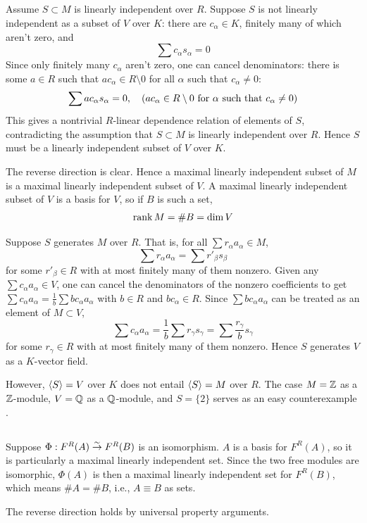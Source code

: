 \documentclass[12pt]{article}
\begin{document}
\setcounter{subsection}{6}
\subsection{} 
Assume $S \subset M$ is linearly independent over $R$.
Suppose $S$ is not linearly independent as a subset of $V$ over $K$: 
there are $c_\alpha \in K$, finitely many of which aren't zero, and 
$$\sum c_\alpha s_\alpha = 0$$
Since only finitely many $c_\alpha$ aren't zero, one can cancel denominators: 
there is some $a \in R$ such that $a c_\alpha \in R \setminus 0$ for all $\alpha$ such that $c_\alpha \neq 0$: 
$$\sum ac_\alpha s_\alpha = 0, \quad (ac_\alpha \in R \setminus 0 \text{ for } \alpha \text{ such that } c_\alpha \neq 0)$$
This gives a nontrivial $R$-linear dependence relation of elements of $S$, contradicting the assumption that $S \subset M$ is linearly independent over $R$. 
Hence $S$ must be a linearly independent subset of $V$ over $K$. 

The reverse direction is clear. 
Hence a maximal linearly independent subset of $M$ is a maximal linearly independent subset of $V$. 
A maximal linearly independent subset of $V$ is a basis for $V$, so if $B$ is such a set, 
$$\operatorname{rank}{M} = \#B = \dim{V}$$

Suppose $S$ generates $M$ over $R$. 
That is, for all $\sum r_\alpha a_\alpha \in M$,
$$\sum r_\alpha a_\alpha = \sum r'_\beta s_\beta$$ 
for some $r'_\beta \in R$ with at most finitely many of them nonzero. 
Given any $\sum c_\alpha a_\alpha \in V$, one can cancel the denominators of the nonzero coefficients to get $\sum c_\alpha a_\alpha = \frac{1}{b} \sum bc_\alpha a_\alpha$ with $b \in R$ and $bc_\alpha \in R$. 
Since $\sum bc_\alpha a_\alpha$ can be treated as an element of $M \subset V$, 
$$\sum c_\alpha a_\alpha = \frac{1}{b} \sum r_\gamma s_\gamma = \sum \frac{r_\gamma}{b} s_\gamma$$
for some $r_\gamma \in R$ with at most finitely many of them nonzero. 
Hence $S$ generates $V$ as a $K$-vector field. 

However, $\langle S\rangle = V$ over $K$ does not entail $\langle S\rangle = M$ over $R$. 
The case $M = \mathbb{Z}$ as a $\mathbb{Z}$-module, $V = \mathbb{Q}$ as a $\mathbb{Q}$-module, and $S = \{2\}$ serves as an easy counterexample .

\subsection{} 
Suppose $\Phi: F^{R}(A) \overset{\sim}{\rightarrow} F^{R}(B)$ is an isomorphism. 
$A$ is a basis for $F^{R}(A)$, so it is particularly a maximal linearly independent set. 
Since the two free modules are isomorphic, $\Phi(A)$ is then a maximal linearly independent set for $F^{R}(B)$, which means $\#A = \# B$, i.e., $A \equiv B$ as sets. 

The reverse direction holds by universal property arguments. 
\end{document}
